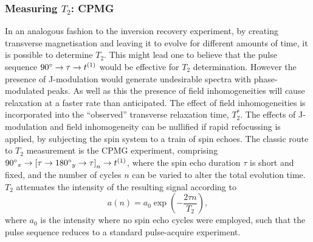 \subsubsection{Measuring $T_2$: \acs{CPMG}}
\label{subsec:cpmg}
In an analogous fashion to the inversion recovery experiment, by creating
transverse magnetisation and leaving it to evolve for different amounts of
time, it is possible to determine $T_2$. This might lead one to believe
that the pulse sequence $\ang{90} \rightarrow \tau \rightarrow t^{(1)}$ would be
effective for  $T_2$ determination. However the presence of J-modulation would
generate undesirable spectra with phase-modulated peaks. As well as this the
presence of field inhomogeneities will cause relaxation at a faster rate than
anticipated. The effect of field inhomogeneities is incorporated into the
``observed'' transverse relaxation time, $T_2^*$. The effects of
J-modulation and field inhomogeneity can be nullified if rapid refocussing is
applied, by subjecting the spin system to a train of spin echoes. The classic
route to $T_2$ measurement is the \ac{CPMG}
experiment\cite{Carr1954,Meiboom1958}, comprising $\ang{90}_x \rightarrow
\left[ \tau \rightarrow \ang{180}_y \rightarrow \tau \right]_n \rightarrow
t^{(1)}$, where the spin echo duration $\tau$ is short and fixed, and the number
of cycles $n$ can be varied to alter the total evolution time. $T_2$ attenuates
the intensity of the resulting signal according to
\begin{equation}
    a(n) = a_0 \exp\left(-\frac{2 \tau n}{T_2}\right),
\end{equation}
where $a_0$ is the intensity where no spin echo cycles were employed, such that
the pulse sequence reduces to a standard pulse-acquire experiment.

